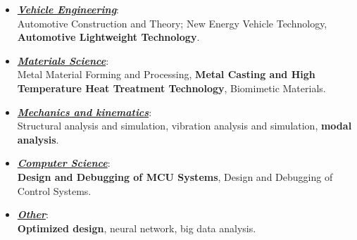 \documentclass{resume}
\begin{document}
\bigskip

\begin{itemize}
  \item \textit{\textbf{\underline{Vehicle Engineering}}}:\\ 
	Automotive Construction and Theory; New Energy Vehicle Technology, \textbf{Automotive Lightweight Technology}.
  \item \textit{\textbf{\underline{Materials Science}}}: \\
	Metal Material Forming and Processing, \textbf{Metal Casting and High Temperature Heat Treatment Technology}, Biomimetic Materials.
  \item \textit{\textbf{\underline{Mechanics and kinematics}}}: \\
	Structural analysis and simulation, vibration analysis and simulation, \textbf{modal analysis}.
  \item \textit{\textbf{\underline{Computer Science}}}: \\
	\textbf{Design and Debugging of MCU Systems}, Design and Debugging of Control Systems.
  \item \textit{\textbf{\underline{Other}}}: \\
	\textbf{Optimized design}, neural network, big data analysis.
\end{itemize}

\clearpage
\end{document}
